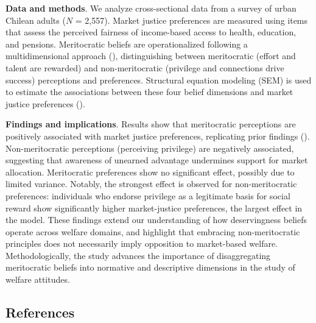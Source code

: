 \documentclass[
  13pt,
]{article}
\begin{document}
\textbf{Data and methods}. We analyze cross-sectional data from a survey
of urban Chilean adults (\(N\) = 2,557). Market justice preferences are
measured using items that assess the perceived fairness of income-based
access to health, education, and pensions. Meritocratic beliefs are
operationalized following a multidimensional approach
(),
distinguishing between meritocratic (effort and talent are rewarded) and
non-meritocratic (privilege and connections drive success) perceptions
and preferences. Structural equation modeling (SEM) is used to estimate
the associations between these four belief dimensions and market justice
preferences ().

\textbf{Findings and implications}. Results show that meritocratic
perceptions are positively associated with market justice preferences,
replicating prior findings
().
Non-meritocratic perceptions (perceiving privilege) are negatively
associated, suggesting that awareness of unearned advantage undermines
support for market allocation. Meritocratic preferences show no
significant effect, possibly due to limited variance. Notably, the
strongest effect is observed for non-meritocratic preferences:
individuals who endorse privilege as a legitimate basis for social
reward show significantly higher market-justice preferences, the largest
effect in the model. These findings extend our understanding of how
deservingness beliefs operate across welfare domains, and highlight that
embracing non-meritocratic principles does not necessarily imply
opposition to market-based welfare. Methodologically, the study advances
the importance of disaggregating meritocratic beliefs into normative and
descriptive dimensions in the study of welfare attitudes.

\subsection{References}\label{references}
\end{document}
